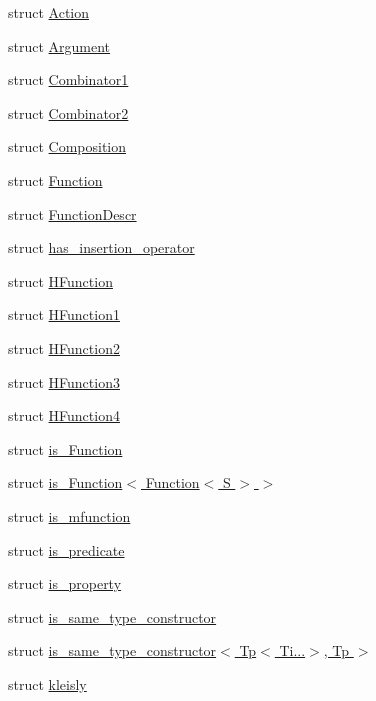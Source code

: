 \begin{DoxyCompactItemize}
\item 
struct \hyperlink{structpfq__lang_1_1Action}{Action}
\item 
struct \hyperlink{structpfq__lang_1_1Argument}{Argument}
\item 
struct \hyperlink{structpfq__lang_1_1Combinator1}{Combinator1}
\item 
struct \hyperlink{structpfq__lang_1_1Combinator2}{Combinator2}
\item 
struct \hyperlink{structpfq__lang_1_1Composition}{Composition}
\item 
struct \hyperlink{structpfq__lang_1_1Function}{Function}
\item 
struct \hyperlink{structpfq__lang_1_1FunctionDescr}{Function\+Descr}
\item 
struct \hyperlink{structpfq__lang_1_1has__insertion__operator}{has\+\_\+insertion\+\_\+operator}
\item 
struct \hyperlink{structpfq__lang_1_1HFunction}{H\+Function}
\item 
struct \hyperlink{structpfq__lang_1_1HFunction1}{H\+Function1}
\item 
struct \hyperlink{structpfq__lang_1_1HFunction2}{H\+Function2}
\item 
struct \hyperlink{structpfq__lang_1_1HFunction3}{H\+Function3}
\item 
struct \hyperlink{structpfq__lang_1_1HFunction4}{H\+Function4}
\item 
struct \hyperlink{structpfq__lang_1_1is__Function}{is\+\_\+\+Function}
\item 
struct \hyperlink{structpfq__lang_1_1is__Function_3_01Function_3_01S_01_4_01_4}{is\+\_\+\+Function$<$ Function$<$ S $>$ $>$}
\item 
struct \hyperlink{structpfq__lang_1_1is__mfunction}{is\+\_\+mfunction}
\item 
struct \hyperlink{structpfq__lang_1_1is__predicate}{is\+\_\+predicate}
\item 
struct \hyperlink{structpfq__lang_1_1is__property}{is\+\_\+property}
\item 
struct \hyperlink{structpfq__lang_1_1is__same__type__constructor}{is\+\_\+same\+\_\+type\+\_\+constructor}
\item 
struct \hyperlink{structpfq__lang_1_1is__same__type__constructor_3_01Tp_3_01Ti_8_8_8_4_00_01Tp_01_4}{is\+\_\+same\+\_\+type\+\_\+constructor$<$ Tp$<$ Ti...$>$, Tp $>$}
\item 
struct \hyperlink{structpfq__lang_1_1kleisly}{kleisly}

\end{DoxyCompactItemize}
